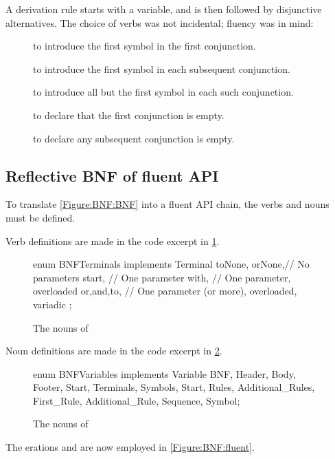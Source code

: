 A derivation rule starts with a variable, and is then followed by disjunctive alternatives.
The choice of verbs was not incidental; fluency was in mind:
\begin{description}
  \item[] to introduce the first symbol in the first conjunction.
  \item[] to introduce the first symbol in each subsequent conjunction.
  \item[] to introduce all but the first symbol in each such conjunction.
  \item[] to declare that the first conjunction is empty.
  \item[] to declare any subsequent conjunction is empty.
\end{description}

\subsection{Reflective BNF of fluent API}

To translate \cref{Figure:BNF:BNF} into a fluent
API chain, the verbs and nouns must be defined.

Verb definitions are made in the code excerpt in
\cref{Figure:Verbs}.

\begin{figure}[H]
  \begin{JAVA}[style=code]
enum BNFTerminals implements Terminal {
  toNone, orNone,// No parameters
  start,         // One parameter 
  with,          // One parameter, overloaded 
  or,and,to,     // One parameter (or more), overloaded, variadic 
  ;
} \end{JAVA}
  \caption{The nouns of \SELF}
  \label{Figure:Verbs}
\end{figure}

Noun definitions are made in the code excerpt in \cref{Figure:Nouns}.

\begin{figure}[H]
  \begin{JAVA}[style=code]
enum BNFVariables implements Variable {
  BNF, Header, Body, Footer,
  Start, Terminals, Symbols,
  Start, Rules, Additional_Rules,
  First_Rule, Additional_Rule,
  Sequence, Symbol;
}\end{JAVA}
  \caption{The nouns of \SELF}
  \label{Figure:Nouns}
\end{figure}

The
erations  and
  are now employed in \cref{Figure:BNF:fluent}.


